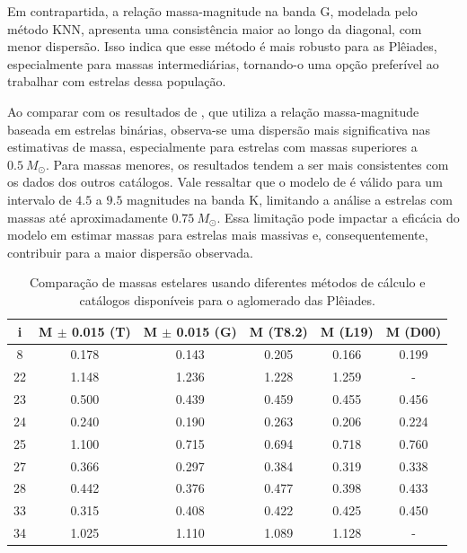 Em contrapartida, a relação massa-magnitude na banda G, modelada pelo método KNN, apresenta uma consistência maior ao longo da diagonal, com menor dispersão. Isso indica que esse método é mais robusto para as Plêiades, especialmente para massas intermediárias, tornando-o uma opção preferível ao trabalhar com estrelas dessa população.

Ao comparar com os resultados de , que utiliza a relação massa-magnitude baseada em estrelas binárias, observa-se uma dispersão mais significativa nas estimativas de massa, especialmente para estrelas com massas superiores a \(0.5~ M_\odot\). Para massas menores, os resultados tendem a ser mais consistentes com os dados dos outros catálogos. Vale ressaltar que o modelo de  é válido para um intervalo de \(4.5\) a \(9.5\) magnitudes na banda K, limitando a análise a estrelas com massas até aproximadamente \(0.75~ M_\odot\). Essa limitação pode impactar a eficácia do modelo em estimar massas para estrelas mais massivas e, consequentemente, contribuir para a maior dispersão observada.

\begin{table}[htbp]
	\centering
	\caption[Resultados de massas estelares para as Plêiades]{Comparação de massas estelares usando diferentes métodos de cálculo e catálogos disponíveis para o aglomerado das Plêiades.}
	\label{tab:ple_massas}
	\begin{tabular}{cccccc}
		\hline
		{i} & {M $\pm$ 0.015 (T)} & {M $\pm$ 0.015 (G)} & {M (T8.2)} & {M (L19)} & {M (D00)} \\ \hline
		8   & 0.178 & 0.143 & 0.205 & 0.166 & 0.199 \\
		22  & 1.148 & 1.236 & 1.228 & 1.259 & - \\
		23  & 0.500 & 0.439 & 0.459 & 0.455 & 0.456 \\
		24  & 0.240 & 0.190 & 0.263 & 0.206 & 0.224 \\
		25  & 1.100 & 0.715 & 0.694 & 0.718 & 0.760 \\
		27  & 0.366 & 0.297 & 0.384 & 0.319 & 0.338 \\
		28  & 0.442 & 0.376 & 0.477 & 0.398 & 0.433 \\
		33  & 0.315 & 0.408 & 0.422 & 0.425 & 0.450 \\
		34  & 1.025 & 1.110 & 1.089 & 1.128 & - \\
		\hline
	\end{tabular}
\end{table}

